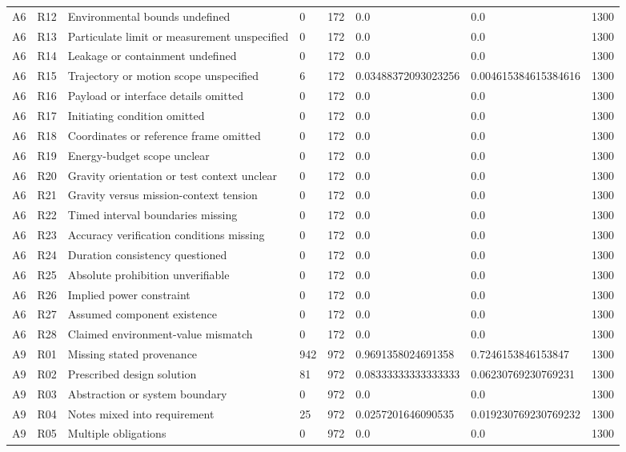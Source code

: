 \begin{tabular}{llllllll}
A6 & R12 & Environmental bounds undefined & 0 & 172 & 0.0 & 0.0 & 1300 \\
A6 & R13 & Particulate limit or measurement unspecified & 0 & 172 & 0.0 & 0.0 & 1300 \\
A6 & R14 & Leakage or containment undefined & 0 & 172 & 0.0 & 0.0 & 1300 \\
A6 & R15 & Trajectory or motion scope unspecified & 6 & 172 & 0.03488372093023256 & 0.004615384615384616 & 1300 \\
A6 & R16 & Payload or interface details omitted & 0 & 172 & 0.0 & 0.0 & 1300 \\
A6 & R17 & Initiating condition omitted & 0 & 172 & 0.0 & 0.0 & 1300 \\
A6 & R18 & Coordinates or reference frame omitted & 0 & 172 & 0.0 & 0.0 & 1300 \\
A6 & R19 & Energy-budget scope unclear & 0 & 172 & 0.0 & 0.0 & 1300 \\
A6 & R20 & Gravity orientation or test context unclear & 0 & 172 & 0.0 & 0.0 & 1300 \\
A6 & R21 & Gravity versus mission-context tension & 0 & 172 & 0.0 & 0.0 & 1300 \\
A6 & R22 & Timed interval boundaries missing & 0 & 172 & 0.0 & 0.0 & 1300 \\
A6 & R23 & Accuracy verification conditions missing & 0 & 172 & 0.0 & 0.0 & 1300 \\
A6 & R24 & Duration consistency questioned & 0 & 172 & 0.0 & 0.0 & 1300 \\
A6 & R25 & Absolute prohibition unverifiable & 0 & 172 & 0.0 & 0.0 & 1300 \\
A6 & R26 & Implied power constraint & 0 & 172 & 0.0 & 0.0 & 1300 \\
A6 & R27 & Assumed component existence & 0 & 172 & 0.0 & 0.0 & 1300 \\
A6 & R28 & Claimed environment-value mismatch & 0 & 172 & 0.0 & 0.0 & 1300 \\
A9 & R01 & Missing stated provenance & 942 & 972 & 0.9691358024691358 & 0.7246153846153847 & 1300 \\
A9 & R02 & Prescribed design solution & 81 & 972 & 0.08333333333333333 & 0.06230769230769231 & 1300 \\
A9 & R03 & Abstraction or system boundary & 0 & 972 & 0.0 & 0.0 & 1300 \\
A9 & R04 & Notes mixed into requirement & 25 & 972 & 0.0257201646090535 & 0.019230769230769232 & 1300 \\
A9 & R05 & Multiple obligations & 0 & 972 & 0.0 & 0.0 & 1300 \\

\end{tabular}
